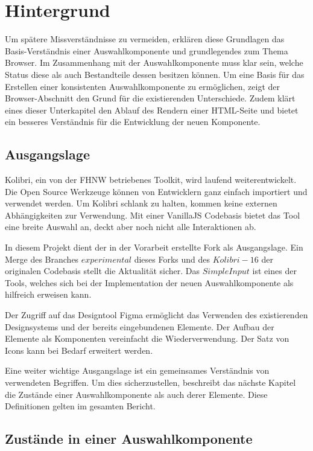 \chapter{Hintergrund}

Um spätere Missverständnisse zu vermeiden, erklären diese Grundlagen das Basis-Verständnis einer Auswahlkomponente und grundlegendes zum Thema Browser.
Im Zusammenhang mit der Auswahlkomponente muss klar sein, welche Status diese als auch Bestandteile dessen besitzen können.
Um eine Basis für das Erstellen einer konsistenten Auswahlkomponente zu ermöglichen, zeigt der Browser-Abschnitt den Grund für die existierenden Unterschiede.
Zudem klärt eines dieser Unterkapitel den Ablauf des Rendern einer HTML-Seite und bietet ein besseres Verständnis für die Entwicklung der neuen Komponente.


\section{Ausgangslage}

Kolibri, ein von der FHNW betriebenes Toolkit, wird laufend weiterentwickelt.
Die Open Source Werkzeuge können von Entwicklern ganz einfach importiert und verwendet werden.
Um Kolibri schlank zu halten, kommen keine externen Abhängigkeiten zur Verwendung.
Mit einer VanillaJS Codebasis bietet das Tool eine breite Auswahl an, deckt aber noch nicht alle Interaktionen ab.

In diesem Projekt dient der in der Vorarbeit erstellte Fork als Ausgangslage.
Ein Merge des Branches $experimental$ dieses Forks und des $Kolibri-16$ der originalen Codebasis stellt die Aktualität sicher.
Das $SimpleInput$ ist eines der Tools, welches sich bei der Implementation der neuen Auswahlkomponente als hilfreich erweisen kann.

Der Zugriff auf das Designtool Figma ermöglicht das Verwenden des existierenden Designsystems und der bereits eingebundenen Elemente. 
Der Aufbau der Elemente als Komponenten vereinfacht die Wiederverwendung. 
Der Satz von Icons kann bei Bedarf erweitert werden.

Eine weiter wichtige Ausgangslage ist ein gemeinsames Verständnis von verwendeten Begriffen. 
Um dies sicherzustellen, beschreibt das nächste Kapitel die Zustände einer Auswahlkomponente als auch derer Elemente.
Diese Definitionen gelten im gesamten Bericht.


\section{Zustände in einer Auswahlkomponente}

